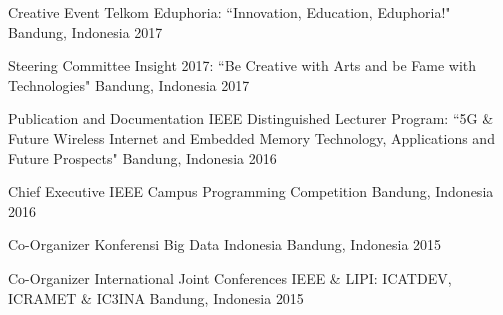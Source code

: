 \begin{cvhonors}

  \cvhonor
    {Creative Event} %
    {Telkom Eduphoria: ``Innovation, Education, Eduphoria!"} %
    {Bandung, Indonesia} %
    {2017} %
    
  \cvhonor
    {Steering Committee} %
    {Insight 2017: ``Be Creative with Arts and be Fame with Technologies"} %
    {Bandung, Indonesia} %
    {2017} %
    
  \cvhonor
    {Publication and Documentation} %
    {IEEE Distinguished Lecturer Program: ``5G \& Future Wireless Internet and Embedded Memory Technology, Applications and Future Prospects"} %
    {Bandung, Indonesia} %
    {2016} %
    
  \cvhonor
    {Chief Executive} %
    {IEEE Campus Programming Competition} %
    {Bandung, Indonesia} %
    {2016} %
    
  \cvhonor
    {Co-Organizer} %
    {Konferensi Big Data Indonesia} %
    {Bandung, Indonesia} %
    {2015} %
    
  \cvhonor
    {Co-Organizer} %
    {International Joint Conferences IEEE \& LIPI: ICATDEV, ICRAMET \& IC3INA} %
    {Bandung, Indonesia} %
    {2015} %

\end{cvhonors}